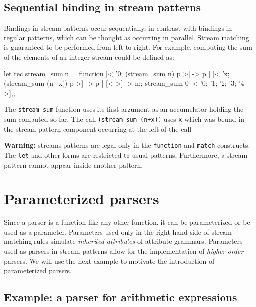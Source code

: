 \subsection{Sequential binding in stream patterns}

Bindings in stream patterns occur sequentially, in contrast with
bindings in regular patterns, which can be thought as occurring in
parallel. Stream matching is guaranteed to be performed from left to right.
For example, computing the sum of the elements of an integer stream
could be defined as:
\begin{caml_example}
let rec stream_sum n = function
  [< '0; (stream_sum n) p >] -> p
| [< 'x; (stream_sum (n+x)) p >] -> p
| [< >] -> n;;
stream_sum 0 [< '0; '1; '2; '3; '4 >];;
\end{caml_example}
The \verb|stream_sum| function uses its first argument as an
accumulator holding the sum computed so far. The call
\verb|(stream_sum (n+x))| uses {\tt x} which was bound in the stream
pattern component occurring at the left of the call.

{\bf Warning:} streams patterns are legal only in the {\tt function}
and {\tt match} constructs. The {\tt let} and other forms are
restricted to usual patterns. Furthermore, a stream pattern cannot
appear inside another pattern.

\section{Parameterized parsers}

Since a parser is a function like any other function, it can be
parameterized or be used as a parameter. Parameters used only in the
right-hand side of stream-matching rules simulate {\em inherited
attributes} of attribute grammars. Parameters used as parsers in
stream patterns allow for the implementation of {\em higher-order}
parsers. We will use the next example to motivate the introduction of
parameterized parsers.

\subsection{Example: a parser for arithmetic expressions}

